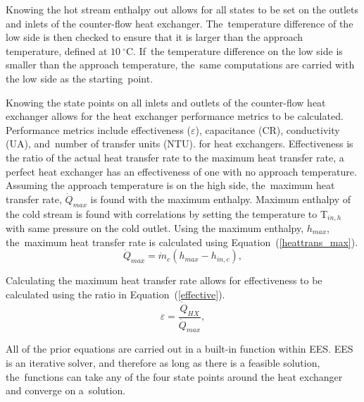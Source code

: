 \documentclass[sustainability,article,accept,moreauthors,pdftex]{Definitions/mdpi}
\begin{document}
Knowing the hot stream enthalpy out allows for all states to be set on the outlets and inlets of the counter-flow heat exchanger. The~temperature difference of the low side is then checked to ensure that it is larger than the approach temperature, defined at $10~^\circ$C. If~the temperature difference on the low side is smaller than the approach temperature, the~same computations are carried with the low side as the starting~point.

Knowing the state points on all inlets and outlets of the counter-flow heat exchanger allows for the heat exchanger performance metrics to be calculated. Performance metrics include %
{effectiveness ($\varepsilon$), capacitance (CR), conductivity (UA), and~number of transfer units (NTU).}
for heat exchangers. Effectiveness is the ratio of the actual heat transfer rate to the maximum heat transfer rate, %
{a perfect heat exchanger has an effectiveness of one}
with no approach temperature. Assuming the approach temperature is on the high side, the~maximum heat transfer rate, $\dot{Q}_{max}$ is found with the maximum enthalpy. Maximum enthalpy of the cold stream is found with correlations by setting the temperature to T$_{in,h}$ with same pressure on the cold outlet. Using the maximum enthalpy, $h_{max}$, the~maximum heat transfer rate is calculated using Equation~(\ref{heattrans_max}).
\begin{equation}
    \label{heattrans_max}
    \dot{Q}_{max} = \dot{m}_{c}(h_{max}-h_{in,c}),
\end{equation}

Calculating the maximum heat transfer rate allows for effectiveness to be calculated using the ratio in Equation~(\ref{effective}).
\begin{equation}
    \label{effective}
    \varepsilon = \frac{\dot{Q}_{HX}}{\dot{Q}_{max}},
\end{equation}

All of the prior equations are carried out in a built-in function within EES. EES is an iterative solver, and therefore as long as there is a feasible solution, the~functions can take any of the four state points around the heat exchanger and converge on a~solution.
\end{document}
